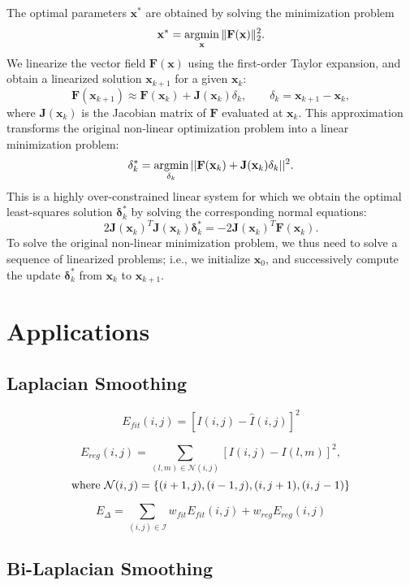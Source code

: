 \documentclass[review]{acmsiggraph}
\begin{document}
The optimal parameters $\mathbf{x}^{*}$ are obtained by solving the minimization problem
$$ \mathbf{x}^{*} = \displaystyle \operatorname*{argmin}_\mathbf{x} \Vert \mathbf{F} (\mathbf{x}) \Vert_2^2.$$
%
We linearize the vector field $\mathbf{F}(\mathbf{x})$ using the first-order Taylor expansion,
and obtain a linearized solution $\mathbf{x}_{k+1}$ for a given $\mathbf{x}_k$:
$$ \mathbf{F}(\mathbf{x}_{k+1}) \approx \mathbf{F}(\mathbf{x}_{k})+\mathbf{J}(\mathbf{x}_{k})\delta_k,\qquad \delta_k = \mathbf{x}_{k+1}-\mathbf{x}_{k},$$
where $\mathbf{J}(\mathbf{x}_k)$ is the Jacobian matrix of $\mathbf{F}$ evaluated at $\mathbf{x}_k$.
This approximation transforms the original non-linear optimization problem into a linear minimization problem:
$$
\mathbf{\delta}_{k}^{*}=\operatorname*{argmin}_{\mathbf{\delta}_{k}}{||\mathbf{F}(\mathbf{x}_{k})+\mathbf{J}(\mathbf{x}_{k})\mathbf{\delta}_{k}||^2}.
$$
This is a highly over-constrained linear system for which we obtain the optimal least-squares solution $\mathbf{\delta}_k^{*}$ by solving the corresponding normal equations:
$$
2 \mathbf{J}(\mathbf{x}_{k})^T\mathbf{J}(\mathbf{x}_{k})\mathbf{\delta}_{k}^{*} = - 2\mathbf{J}(\mathbf{x}_{k})^T\mathbf{F}(\mathbf{x}_{k}).
$$
To solve the original non-linear minimization problem, we thus need to solve a sequence of linearized problems;
i.e., we initialize $\mathbf{x}_0$, and successively compute the update $\mathbf{\delta}_k^{*}$ from $\mathbf{x}_k$ to $\mathbf{x}_{k+1}$.

\section{Applications}



\subsection{Laplacian Smoothing} 
$$E_{\mathit{fit}}(i,j) = [I(i,j) - \hat{I}(i,j) ]^2$$

$$E_{\mathit{reg}}(i,j) = \sum_{(l,m) \in \mathcal{N}(i,j)} [I(i,j) - I(l,m) ]^2,$$
$$\textnormal{where}\ \mathcal{N}(i,j) = \{(i+1,j), (i-1,j), (i,j+1), (i,j-1)\}$$

$$E_{\Delta} = \sum_{(i,j) \in \mathcal{I}} w_{\mathit{fit}} E_{\mathit{fit}}(i,j) + w_{\mathit{reg}} E_{\mathit{reg}}(i,j)$$

\subsection{Bi-Laplacian Smoothing}
\end{document}
